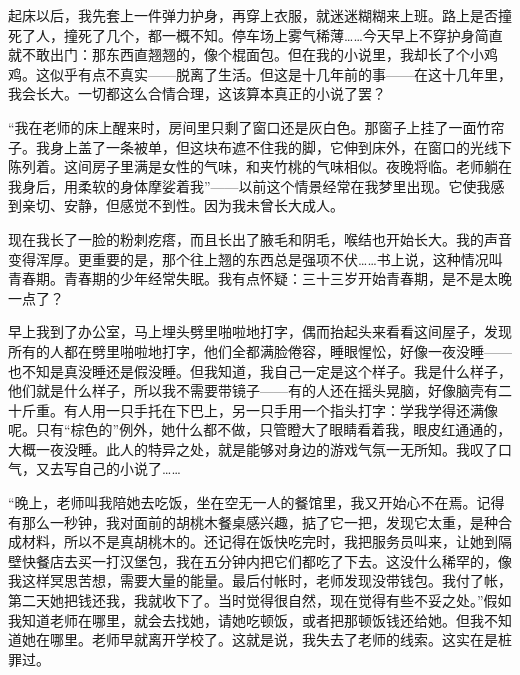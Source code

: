 起床以后，我先套上一件弹力护身，再穿上衣服，就迷迷糊糊来上班。路上是否撞死了人，撞死了几个，都一概不知。停车场上雾气稀薄……今天早上不穿护身简直就不敢出门：那东西直翘翘的，像个棍面包。但在我的小说里，我却长了个小鸡鸡。这似乎有点不真实——脱离了生活。但这是十几年前的事——在这十几年里，我会长大。一切都这么合情合理，这该算本真正的小说了罢？ 

“我在老师的床上醒来时，房间里只剩了窗口还是灰白色。那窗子上挂了一面竹帘子。我身上盖了一条被单，但这块布遮不住我的脚，它伸到床外，在窗口的光线下陈列着。这间房子里满是女性的气味，和夹竹桃的气味相似。夜晚将临。老师躺在我身后，用柔软的身体摩娑着我”——以前这个情景经常在我梦里出现。它使我感到亲切、安静，但感觉不到性。因为我未曾长大成人。 

现在我长了一脸的粉刺疙瘩，而且长出了腋毛和阴毛，喉结也开始长大。我的声音变得浑厚。更重要的是，那个往上翘的东西总是强项不伏……书上说，这种情况叫青春期。青春期的少年经常失眠。我有点怀疑：三十三岁开始青春期，是不是太晚一点了？ 

早上我到了办公室，马上埋头劈里啪啦地打字，偶而抬起头来看看这间屋子，发现所有的人都在劈里啪啦地打字，他们全都满脸倦容，睡眼惺忪，好像一夜没睡——也不知是真没睡还是假没睡。但我知道，我自己一定是这个样子。我是什么样子，他们就是什么样子，所以我不需要带镜子——有的人还在摇头晃脑，好像脑壳有二十斤重。有人用一只手托在下巴上，另一只手用一个指头打字：学我学得还满像呢。只有“棕色的”例外，她什么都不做，只管瞪大了眼睛看着我，眼皮红通通的，大概一夜没睡。此人的特异之处，就是能够对身边的游戏气氛一无所知。我叹了口气，又去写自己的小说了…… 

“晚上，老师叫我陪她去吃饭，坐在空无一人的餐馆里，我又开始心不在焉。记得有那么一秒钟，我对面前的胡桃木餐桌感兴趣，掂了它一把，发现它太重，是种合成材料，所以不是真胡桃木的。还记得在饭快吃完时，我把服务员叫来，让她到隔壁快餐店去买一打汉堡包，我在五分钟内把它们都吃了下去。这没什么稀罕的，像我这样冥思苦想，需要大量的能量。最后付帐时，老师发现没带钱包。我付了帐，第二天她把钱还我，我就收下了。当时觉得很自然，现在觉得有些不妥之处。”假如我知道老师在哪里，就会去找她，请她吃顿饭，或者把那顿饭钱还给她。但我不知道她在哪里。老师早就离开学校了。这就是说，我失去了老师的线索。这实在是桩罪过。 

